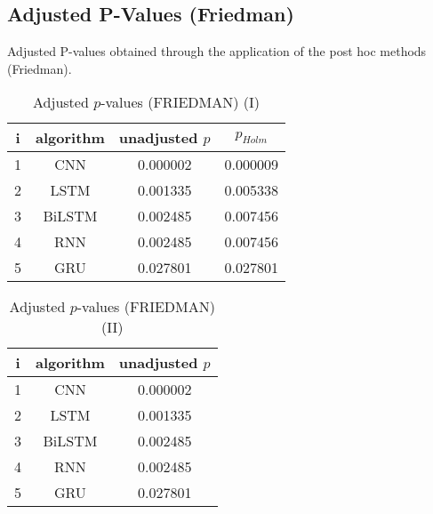 \documentclass[a4paper,10pt]{article}
\begin{document}
\begin{landscape}
\section{Adjusted P-Values (Friedman)}


Adjusted P-values obtained through the application of the post hoc methods (Friedman).

\begin{table}[!htp]
\centering\small
\begin{tabular}{cccc}
i&algorithm&unadjusted $p$&$p_{Holm}$\\
\hline1&CNN&0.000002&0.000009\\2&LSTM&0.001335&0.005338\\3&BiLSTM&0.002485&0.007456\\4&RNN&0.002485&0.007456\\5&GRU&0.027801&0.027801\\\hline
\end{tabular}
\caption{Adjusted $p$-values (FRIEDMAN) (I)}
\end{table}
\begin{table}[!htp]
\centering\small
\begin{tabular}{ccc}
i&algorithm&unadjusted $p$\\
\hline1&CNN&0.000002\\2&LSTM&0.001335\\3&BiLSTM&0.002485\\4&RNN&0.002485\\5&GRU&0.027801\\\hline
\end{tabular}
\caption{Adjusted $p$-values (FRIEDMAN) (II)}
\end{table}

\newpage
\end{landscape}
\end{document}
